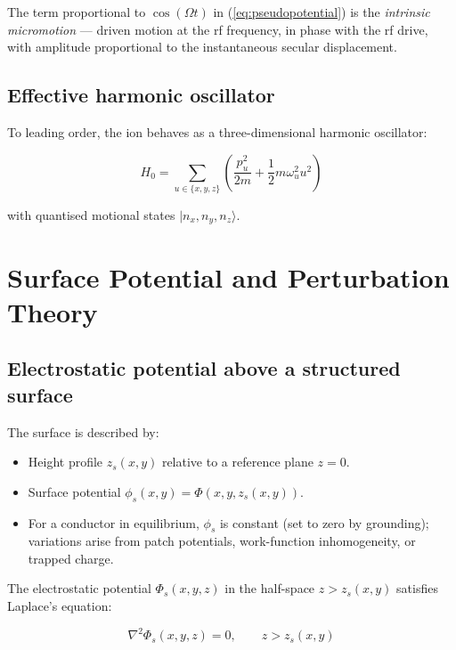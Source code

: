 \documentclass[11pt,a4paper]{article}
\begin{document}
The term proportional to $\cos(\Omega t)$ in (\ref{eq:pseudopotential}) is the
\emph{intrinsic micromotion} — driven motion at the rf frequency, in phase with
the rf drive, with amplitude proportional to the instantaneous secular displacement.

\subsection{Effective harmonic oscillator}

To leading order, the ion behaves as a three-dimensional harmonic oscillator:

\begin{equation}
H_0 = \sum_{u\in\{x,y,z\}} \left(\frac{p_u^2}{2m} + \frac{1}{2}m\omega_u^2 u^2\right)
\label{eq:HO_hamiltonian}
\end{equation}

with quantised motional states $|n_x, n_y, n_z\rangle$.

\section{Surface Potential and Perturbation Theory}

\subsection{Electrostatic potential above a structured surface}

The surface is described by:
\begin{itemize}
    \item Height profile $z_s(x,y)$ relative to a reference plane $z = 0$.
    \item Surface potential $\phi_s(x,y) = \Phi(x,y,z_s(x,y))$.
    \item For a conductor in equilibrium, $\phi_s$ is constant (set to zero by grounding);
    variations arise from patch potentials, work-function inhomogeneity, or trapped charge.
\end{itemize}

The electrostatic potential $\Phi_s(x,y,z)$ in the half-space $z > z_s(x,y)$
satisfies Laplace's equation:

\begin{equation}
\nabla^2\Phi_s(x,y,z) = 0, \qquad z > z_s(x,y)
\label{eq:laplace}
\end{equation}
\end{document}
